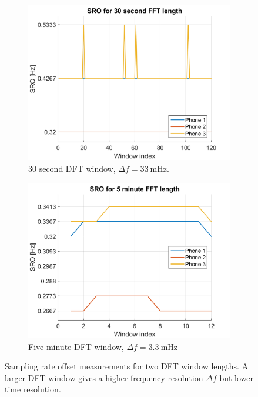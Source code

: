 \documentclass[a4paper, notitlepage]{report}
\begin{document}
\begin{figure}[htb]
\begin{adjustwidth}{-1in}{-1in}
\centering
	\begin{subfigure}{0.5\textwidth}
		\includegraphics[width=\textwidth]{figures/sro-measurement/sro-30sec}
		\caption{30 second DFT window, $\Delta f=33~\mathrm{mHz}$.}
		\label{fig:sro_30sec}
	\end{subfigure}
	\begin{subfigure}{0.5\textwidth}
		\includegraphics[width=\textwidth]{figures/sro-measurement/sro-5min}
		\caption{Five minute DFT window, $\Delta f=3.3~\mathrm{mHz}$}
		\label{fig:sro_5min}
	\end{subfigure}	
\end{adjustwidth}
\caption[SRO measurement result.]{Sampling rate offset measurements for two DFT window lengths. A larger DFT window gives a higher frequency resolution $\Delta f$ but lower time resolution.}
\label{fig:sro_result}
\end{figure}
\end{document}
